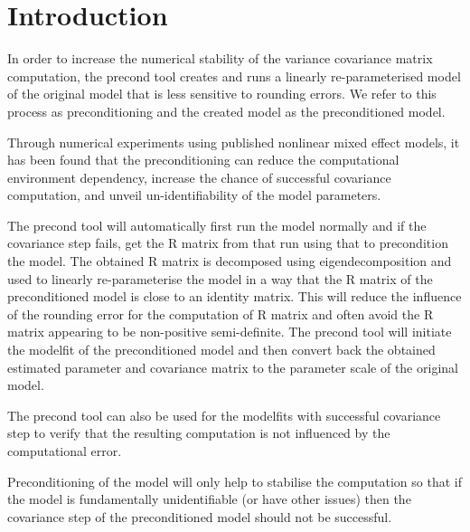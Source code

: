 
\usepackage{color}
\usepackage{amsmath}
\usepackage{tikz}
\usetikzlibrary{shapes,arrows}




\maketitle

\section{Introduction}

In order to increase the numerical stability of the variance covariance matrix computation, the precond tool creates and runs a linearly re-parameterised model of the original model that is less sensitive to rounding errors.  We refer to this process as preconditioning and the created model as the preconditioned model. 

Through numerical experiments \cite{Aoki} using published nonlinear mixed effect models, it has been found that the preconditioning can reduce the computational environment dependency, increase the chance of successful covariance computation, and unveil un-identifiability of the model parameters.

The precond tool will automatically first run the model normally and if the covariance step fails, get the R matrix from that run using that to precondition the model. The obtained R matrix is decomposed using eigendecomposition and used to linearly re-parameterise the model in a way that the R matrix of the preconditioned model is close to an identity matrix.  This will reduce the influence of the rounding error for the computation of R matrix and often avoid the R matrix appearing to be non-positive semi-definite.  The precond tool will initiate the modelfit of the preconditioned model and then convert back the obtained estimated parameter and covariance matrix to the parameter scale of the original model.

The precond tool can also be used for the modelfits with successful covariance step to verify that the resulting computation is not influenced by the computational error.

Preconditioning of the model will only help to stabilise the computation so that if the model is fundamentally unidentifiable (or have other issues) then the covariance step of the preconditioned model should not be successful.

